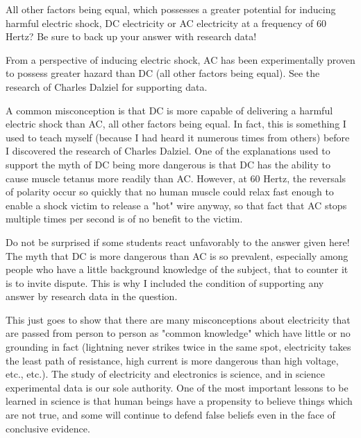 

All other factors being equal, which possesses a greater potential for inducing harmful electric shock, DC electricity or AC electricity at a frequency of 60 Hertz?  Be sure to back up your answer with research data!







From a perspective of inducing electric shock, AC has been experimentally proven to possess greater hazard than DC (all other factors being equal).  See the research of Charles Dalziel for supporting data.







A common misconception is that DC is more capable of delivering a harmful electric shock than AC, all other factors being equal.  In fact, this is something I used to teach myself (because I had heard it numerous times from others) before I discovered the research of Charles Dalziel.  One of the explanations used to support the myth of DC being more dangerous is that DC has the ability to cause muscle tetanus more readily than AC.  However, at 60 Hertz, the reversals of polarity occur so quickly that no human muscle could relax fast enough to enable a shock victim to release a "hot" wire anyway, so that fact that AC stops multiple times per second is of no benefit to the victim.

Do not be surprised if some students react unfavorably to the answer given here!  The myth that DC is more dangerous than AC is so prevalent, especially among people who have a little background knowledge of the subject, that to counter it is to invite dispute.  This is why I included the condition of supporting any answer by research data in the question.

This just goes to show that there are many misconceptions about electricity that are passed from person to person as "common knowledge" which have little or no grounding in fact (lightning never strikes twice in the same spot, electricity takes the least path of resistance, high current is more dangerous than high voltage, etc., etc.).  The study of electricity and electronics is science, and in science experimental data is our sole authority.  One of the most important lessons to be learned in science is that human beings have a propensity to believe things which are not true, and some will continue to defend false beliefs even in the face of conclusive evidence.



